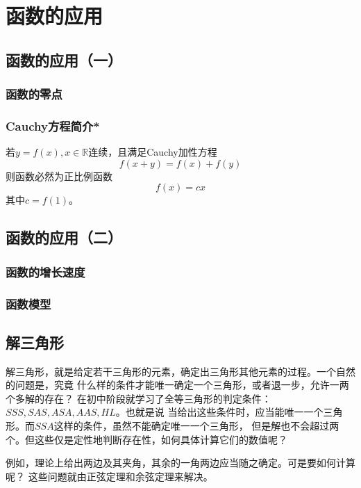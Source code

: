 \chapter{函数的应用}
\section{函数的应用（一）}
\subsection{函数的零点}
\clearpage
\subsection{Cauchy方程简介*}
\begin{theorem}
    若\(y=f(x), x\in \mathbb{R}\)连续，且满足Cauchy加性方程
    \begin{equation}
        f(x+y)=f(x)+f(y)
    \end{equation}
    则函数必然为正比例函数\[f(x)=cx\]
    其中\(c=f(1)\)。
\end{theorem}
\clearpage
\section{函数的应用（二）}
\subsection{函数的增长速度}
\clearpage
\subsection{函数模型}
\clearpage
\section{解三角形}
解三角形，就是给定若干三角形的元素，确定出三角形其他元素的过程。一个自然的问题是，究竟
什么样的条件才能唯一确定一个三角形，或者退一步，允许一两个多解的存在？
在初中阶段就学习了全等三角形的判定条件：$SSS,SAS,ASA,AAS,HL$。也就是说
当给出这些条件时，应当能唯一一个三角形。而$SSA$这样的条件，虽然不能确定唯一一个三角形，
但是解也不会超过两个。但这些仅是定性地判断存在性，如何具体计算它们的数值呢？

例如，理论上给出两边及其夹角，其余的一角两边应当随之确定。可是要如何计算呢？
这些问题就由正弦定理和余弦定理来解决。

